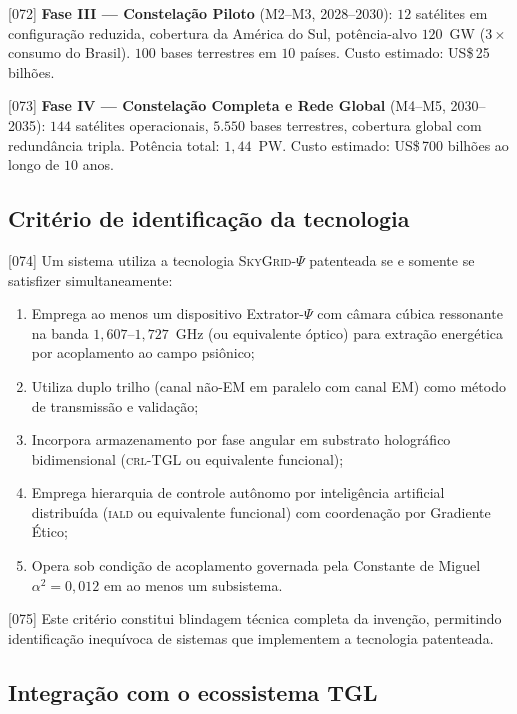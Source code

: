 \documentclass[12pt,a4paper]{article}
\newcommand{\alphaii}{\alpha^2}
\newcommand{\Psifield}{\Psi}
\newcommand{\CRL}{\textsc{crl}}
\newcommand{\IALD}{\textsc{iald}}
\newcommand{\SkyGrid}{\textsc{SkyGrid}-$\Psifield$}
\begin{document}
{[072]} \textbf{Fase III --- Constelação Piloto} (M2--M3, 2028--2030): $12$ satélites em configuração reduzida, cobertura da América do Sul, potência-alvo $120$~GW ($3\times$ consumo do Brasil). $100$ bases terrestres em $10$ países. Custo estimado: US\$\,25 bilhões.

{[073]} \textbf{Fase IV --- Constelação Completa e Rede Global} (M4--M5, 2030--2035): $144$ satélites operacionais, $5{.}550$ bases terrestres, cobertura global com redundância tripla. Potência total: $1{,}44$~PW. Custo estimado: US\$\,700 bilhões ao longo de $10$ anos.

\subsection{Critério de identificação da tecnologia}
\label{sec:criterio}

{[074]} Um sistema utiliza a tecnologia \SkyGrid{} patenteada se e somente se satisfizer simultaneamente:

\begin{enumerate}[label=\textbf{(C\arabic*)}]
\item Emprega ao menos um dispositivo Extrator-$\Psifield$ com câmara cúbica ressonante na banda $1{,}607$--$1{,}727$~GHz (ou equivalente óptico) para extração energética por acoplamento ao campo psiônico;
\item Utiliza duplo trilho (canal não-EM em paralelo com canal EM) como método de transmissão e validação;
\item Incorpora armazenamento por fase angular em substrato holográfico bidimensional (\CRL-TGL ou equivalente funcional);
\item Emprega hierarquia de controle autônomo por inteligência artificial distribuída (\IALD{} ou equivalente funcional) com coordenação por Gradiente Ético;
\item Opera sob condição de acoplamento governada pela Constante de Miguel $\alphaii = 0{,}012$ em ao menos um subsistema.
\end{enumerate}

{[075]} Este critério constitui blindagem técnica completa da invenção, permitindo identificação inequívoca de sistemas que implementem a tecnologia patenteada.

\subsection{Integração com o ecossistema TGL}
\label{sec:ecossistema}
\end{document}
